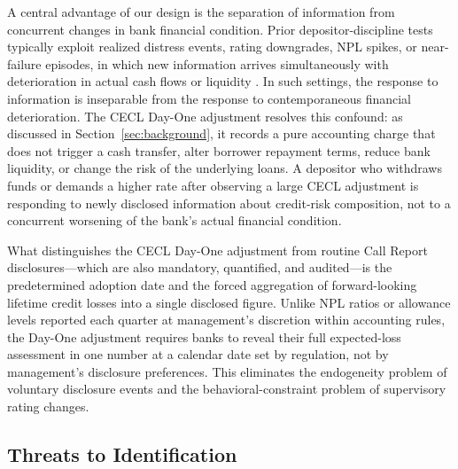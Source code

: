 A central advantage of our design is the separation of information from
concurrent changes in bank financial condition.  Prior depositor-discipline
tests typically exploit realized distress events, rating downgrades, NPL
spikes, or near-failure episodes, in which new information arrives
simultaneously with deterioration in actual cash flows or liquidity
\citep{flannery1996evidence, martinez2001depositors, iyer2016tale}.
In such settings, the response to information is inseparable from the
response to contemporaneous financial deterioration.  The CECL Day-One
adjustment resolves this confound: as discussed in
Section~\ref{sec:background}, it records a pure accounting charge that does
not trigger a cash transfer, alter borrower repayment terms, reduce bank
liquidity, or change the risk of the underlying loans.  A depositor who
withdraws funds or demands a higher rate after observing a large CECL
adjustment is responding to newly disclosed information about credit-risk
composition, not to a concurrent worsening of the bank's actual financial
condition.

What distinguishes the CECL Day-One adjustment from routine Call Report
disclosures---which are also mandatory, quantified, and audited---is the
predetermined adoption date and the forced aggregation of forward-looking
lifetime credit losses into a single disclosed figure.  Unlike NPL ratios or
allowance levels reported each quarter at management's discretion within
accounting rules, the Day-One adjustment requires banks to reveal their full
expected-loss assessment in one number at a calendar date set by regulation,
not by management's disclosure preferences.  This eliminates the endogeneity
problem of voluntary disclosure events and the behavioral-constraint problem
of supervisory rating changes.

\subsection{Threats to Identification}
\label{sec:identification:threats}

